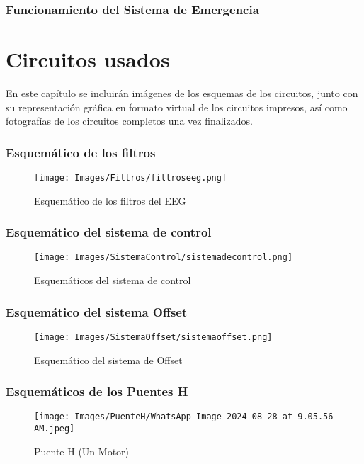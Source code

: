 \documentclass{article}
\begin{document}
\subsubsection{Funcionamiento del Sistema de Emergencia}



\section{Circuitos usados}
En este capítulo se incluirán imágenes de los esquemas de los circuitos, junto con su representación gráfica en formato virtual de los circuitos impresos, así como fotografías de los circuitos completos una vez finalizados.


\subsubsection{Esquemático de los filtros}
\begin{figure}[H]
    \centering
    \texttt{[image: Images/Filtros/filtroseeg.png]}
    \caption{Esquemático de los filtros del EEG}
\end{figure}

\subsubsection{Esquemático del sistema de control}
\begin{figure}[H]
    \centering
    \texttt{[image: Images/SistemaControl/sistemadecontrol.png]}
    \caption{Esquemáticos del sistema de control}
\end{figure}

\subsubsection{Esquemático del sistema Offset}
\begin{figure}[H]
    \centering
    \texttt{[image: Images/SistemaOffset/sistemaoffset.png]}
    \caption{Esquemático del sistema de Offset}
\end{figure}

\subsubsection{Esquemáticos de los Puentes H}
\begin{figure}[H]
    \centering
     \texttt{[image: Images/PuenteH/WhatsApp Image 2024-08-28 at 9.05.56 AM.jpeg]}
    \caption{Puente H (Un Motor)}
\end{figure}
\end{document}
